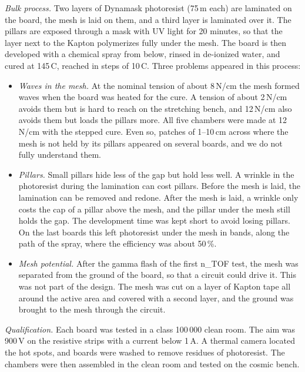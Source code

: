 \emph{Bulk process.} Two layers of Dynamask photoresist (75\,\textmu m each) are laminated on the board, the mesh is laid
on them, and a third layer is laminated over it. The pillars are exposed through a mask with UV light for 20 minutes, so
that the layer next to the Kapton polymerizes fully under the mesh. The board is then developed with a chemical spray from
below, rinsed in de-ionized water, and cured at 145\,\textdegree C, reached in steps of 10\,\textdegree C. Three problems
appeared in this process:
\begin{itemize}
  \item \emph{Waves in the mesh.} At the nominal tension of about 8\,N/cm the mesh formed waves when the board was
  heated for the cure. A tension of about 2\,N/cm avoids them but is hard to reach on the stretching bench, and
  12\,N/cm also avoids them but loads the pillars more. All five chambers were made at 12\,N/cm with the stepped cure.
  Even so, patches of 1--10\,cm across where the mesh is not held by its pillars appeared on several boards, and we do
  not fully understand them.
  \item \emph{Pillars.} Small pillars hide less of the gap but hold less well. A wrinkle in the photoresist during the
  lamination can cost pillars. Before the mesh is laid, the lamination can be removed and redone. After the mesh is
  laid, a wrinkle only costs the cap of a pillar above the mesh, and the pillar under the mesh still holds the gap. The
  development time was kept short to avoid losing pillars. On the last boards this left photoresist under the mesh in
  bands, along the path of the spray, where the efficiency was about 50\,\%.
  \item \emph{Mesh potential.} After the gamma flash of the first n\_TOF test, the mesh was separated from the ground of
  the board, so that a circuit could drive it. This was not part of the design. The mesh was cut on a layer of Kapton
  tape all around the active area and covered with a second layer, and the ground was brought to the mesh through the
  circuit.
\end{itemize}

\emph{Qualification.} Each board was tested in a class 100\,000 clean room. The aim was 900\,V on the resistive strips
with a current below 1\,\textmu A. A thermal camera located the hot spots, and boards were washed to remove residues of
photoresist. The chambers were then assembled in the clean room and tested on the cosmic bench.

